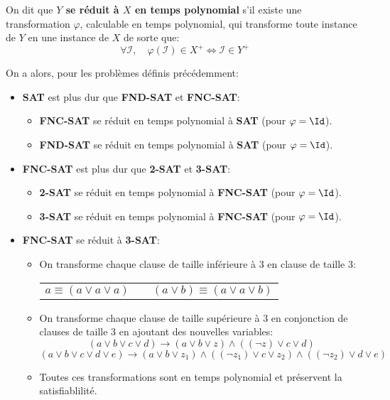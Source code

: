 \documentclass{scrartcl}
\begin{document}
		 On dit que \textbf{$Y$ se réduit à $X$ en temps polynomial} s'il existe une transformation $\varphi$,
		calculable en temps polynomial, qui transforme toute instance de $Y$ en une instance de $X$ de sorte que:
		\[
			\forall \mathcal{I}, \quad \varphi(\mathcal{I}) \in X^+ \Leftrightarrow \mathcal{I} \in Y^+
		\]
		
		On a alors, pour les problèmes définis précédemment:
		\begin{itemize}
			\item \textbf{SAT} est plus dur que \textbf{FND-SAT} et \textbf{FNC-SAT}:
			\begin{itemize}
				\item \textbf{FNC-SAT} se réduit en temps polynomial à \textbf{SAT} (pour $\varphi = \Id$).
				\item \textbf{FND-SAT} se réduit en temps polynomial à \textbf{SAT} (pour $\varphi = \Id$).
			\end{itemize}
			\item \textbf{FNC-SAT} est plus dur que \textbf{2-SAT} et \textbf{3-SAT}:
			\begin{itemize}
				\item \textbf{2-SAT} se réduit en temps polynomial à \textbf{FNC-SAT} (pour $\varphi = \Id$).
				\item \textbf{3-SAT} se réduit en temps polynomial à \textbf{FNC-SAT} (pour $\varphi = \Id$).
			\end{itemize}
			\item \textbf{FNC-SAT} se réduit à \textbf{3-SAT}:
			\begin{itemize}
				\item On transforme chaque clause de taille inférieure à 3 en clause de taille 3:
				\begin{center}\begin{tabular}{c c c}
					$a \equiv (a \vee a \vee a)$ & \quad & $(a \vee b) \equiv (a \vee a \vee b)$
				\end{tabular}\end{center}
				\item On transforme chaque clause de taille supérieure à 3 en conjonction de clauses de taille 3 en ajoutant des nouvelles variables:
				\[
					(a \vee b \vee c \vee d) \longrightarrow (a \vee b \vee z) \wedge ((\neg z) \vee c \vee d) 
				\]
				\[
					(a \vee b \vee c \vee d \vee e) \longrightarrow (a \vee b \vee z_1) \wedge ((\neg z_1) \vee c \vee z_2) \wedge ((\neg z_2) \vee d \vee e) 
				\]
				\item Toutes ces transformations sont en temps polynomial et préservent la satisfiablilité.
			\end{itemize}
		\end{itemize}
\end{document}
